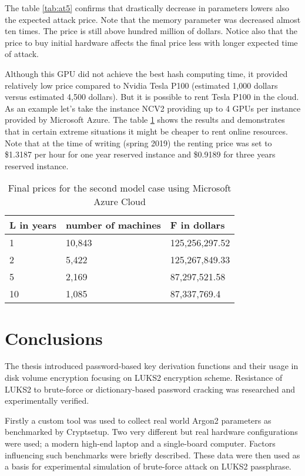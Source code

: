 \documentclass[nolof,digital]{fithesis3}
\begin{document}
The table \ref{tab:at5} confirms that drastically decrease in parameters lowers also the expected attack price. Note that the memory parameter was decreased almost ten times. The price is still above hundred million of dollars. Notice also that the price to buy initial hardware affects the final price less with longer expected time of attack.

Although this GPU did not achieve the best hash computing time, it provided relatively low price compared to Nvidia Tesla P100 (estimated 1,000 dollars versus estimated 4,500 dollars). But it is possible to rent Tesla P100 in the cloud. As an example let's take the instance NCV2 providing up to 4 GPUs per instance provided by Microsoft Azure. The table \ref{tab:at6} shows the results and demonstrates that in certain extreme situations it might be cheaper to rent online resources. Note that at the time of writing (spring 2019) the renting price was set to \$1.3187 per hour for one year reserved instance and \$0.9189 for three years reserved instance.


\noindent
\begin{table}
\caption{Final prices for the second model case using Microsoft Azure Cloud}
\label{tab:at6}
\begin{tabularx}{\textwidth}{| X | X | X |}
\hline
L  in years & number of machines & F in dollars\\
\hline
1 & 10,843 & 125,256,297.52\\
\hline
2 & 5,422 & 125,267,849.33\\
\hline
5 & 2,169 & 87,297,521.58\\
\hline
10 & 1,085 & 87,337,769.4\\
\hline
\end{tabularx}
\end{table}

\chapter{Conclusions}
The thesis introduced password-based key derivation functions and their usage in disk volume encryption focusing on LUKS2 encryption scheme. Resistance of LUKS2 to brute-force or dictionary-based password cracking was researched and experimentally verified.

Firstly a custom tool was used to collect real world Argon2 parameters as benchmarked by Cryptsetup. Two very different but real hardware configurations were used; a modern high-end laptop and a single-board computer. Factors influencing such benchmarks were briefly described. These data were then used as a basis for experimental simulation of brute-force attack on LUKS2 passphrase.
\end{document}
